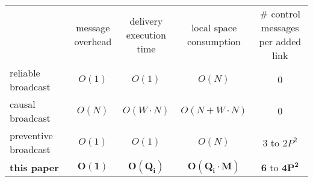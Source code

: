 \newcommand{\cmark}{\ding{51}}%
\newcommand{\xmark}{\ding{55}}%


\small

\begin{tabularx}{1\columnwidth}{@{}Xcccc@{}}
  & \makecell{message\\overhead} &  \makecell{delivery\\execution time} & \makecell{local space\\consumption} & \makecell{\# control messages\\per added link} \\ \cmidrule{2-5}
  reliable broadcast~\cite{hadzilacos1994modular} & $O(1)$ & $O(1)$ & $O(N)$ & $0$ \\
  causal broadcast~\cite{schwarz1994detecting} & $O(N)$ & $O(W\cdot N)$ & $O(N+W\cdot N)$ & $0$ \\ 
  preventive broadcast~\cite{nedelec2018pcbroadcast} & $O(1)$ & $O(1)$ & $O(N)$ & $3$ to $2P^2$ \\ \hline\hline
  \textbf{this paper} & $\mathbf{O(1)}$ & $\mathbf{O(Q_i)}$ & $\mathbf{O(Q_i \cdot M)}$ & $\mathbf{6}$ to $\mathbf{4P^2}$ \\
\end{tabularx}

